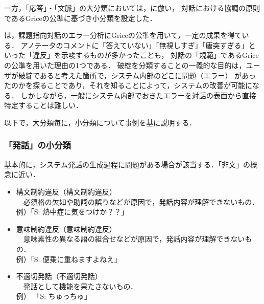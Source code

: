\documentclass[japanese]{jnlp_1.4}
\renewcommand{\mod}[1]{}
\begin{document}
一方，「応答」・「文脈」の大分類においては，\cite{bernsen1996principles,dybkjaer1996grice}に倣い，
対話における協調の原則であるGriceの公準\cite{gri:log}に基づき小分類を設定した．
\mod{Grice の公準は，量・質・関係・様態の各公準からなるもので，対話において参
与者が遵守するように期待されている原則である．つまり，ユーザの直前の発話
あるいはこれまでの対話履歴を受けてなされるシステム発話が守ると期待されて
いる原則であるので，一般的にはこの原則が守られていないと，ユーザはシステ
ムの発話意図を推測することができずに，対話が破綻すると考えられる．}
\cite{bernsen1996principles,dybkjaer1996grice}は，課題指向対話のエラー分析にGriceの公準を用いて，一定の成果を得ている．
アノテータのコメントに「答えていない」「無視しすぎ」「唐突すぎる」といった「違反」を示唆するものが多かったことも，
対話の「規範」であるGriceの公準を用いた理由の1つである．
破綻を分類することの一義的な目的は，ユーザが破綻であると考えた箇所で，システム内部のどこに問題（エラー）
があったのかを探ることであり，それを知ることによって，システムの改善が可能になる．
しかしながら，一般にシステム内部でおきたエラーを対話の表面から直接特定することは難しい．
\mod{そこで，
システムが何をしてしまったのか（どういう問題行動をしたか）を
Grice の公準に基づいて分類することを基本とし
た．ただし，問題行動の原因が比較的解り易いエラーについては，
「応答」大分類中の「誤解」および「文脈」大分類中の「不追随」として追加した．}

以下で，大分類毎に，小分類について事例を基に説明する．


\subsubsection{「発話」の小分類}

基本的に，システム発話の生成過程に問題がある場合が該当する．「非文」の概念に近い．

\begin{itemize}
\item 構文制約違反（構文制約違反）\\
　必須格の欠如や助詞の誤りなどが原因で，発話内容が理解できないもの．\\
例）「S: 熱中症に気をつけか？？」
\item 意味制約違反（意味制約違反）\\
　意味素性の異なる語の組合せなどが原因で，発話内容が理解できないもの．\\
例）「S: 便乗に重ねますよねえ」
\item 不適切発話（不適切発話）\\
　発話として機能を果たさないもの．\\
例） 「S: ちゅっちゅ」
\end{itemize}
\end{document}
